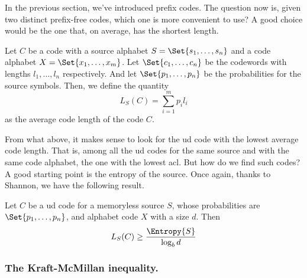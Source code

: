\documentclass{subfiles}
\begin{document}
    In the previous section, we've introduced prefix codes. 
    The question now is, given two distinct prefix-free codes,
        which one is more convenient to use?
        A good choice would be the one that, on average,
        has the shortest length.

    \begin{definition*}
        Let \(C\) be a code with a source alphabet \(S = \Set{s_{1}, \ldots, s_{n}}\)
        and a code alphabet \(X = \Set{x_{1}, \ldots, x_{m}}\). 
        Let \(\Set{c_{1}, \ldots, c_{n}}\) be the codewords with lengths 
        \(l_{1}, \ldots, l_{n}\) respectively. And let \(\Set{p_{1}, \ldots, p_{n}}\)
        be the probabilities for the source symbols. 
            Then, we define the quantity
            \[
                L_{S}(C) = \sum_{i = 1}^{m}{p_{i} l_{i}}
            \]
            as the average code length of the code \(C\).
    \end{definition*}
    From what above, it makes sense to look for the \gls{ud} code with the lowest average code length.
    That is, among all the \gls{ud} codes for the same source and with the same code alphabet,
    the one with the lowest \gls{acl}. But how do we find such codes?
    A good starting point is the entropy of the source. Once again, 
    thanks to Shannon, we have the following result.
    \begin{theorem*}[Shannon]
        Let \(C\) be a \gls{ud} code for a memoryless source \(S\),
        whose probabilities are \(\Set{p_{1}, \ldots, p_{n}}\),
        and alphabet code \(X\) with a size \(d\). 
        Then 
        \[
            L_{S}(C) \ge \frac{\Entropy{S}}{\log_{b}{d}}
        \]
    \end{theorem*}

    \subsubsection{The Kraft-McMillan inequality.}
    
\end{document}
